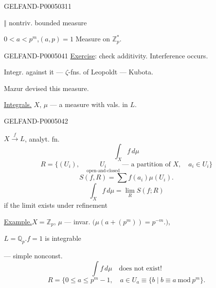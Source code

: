 \begin{GelfandAdjacentEvidence}{GELFAND-P000503}{11}

\begin{flushright}
$\Vert$ nontriv. bounded measure
\end{flushright}
$0<a<p^m$,\quad $(a,p)=1$ \quad Measure on $\mathbb Z_p^*$.
\end{GelfandAdjacentEvidence}



\begin{GelfandAdjacentEvidence}{GELFAND-P000504}{1}
\uline{Exercise}: check additivity. Interference occurs.

Integr. against it — $\zeta$-fns. of Leopoldt — Kubota.

Mazur devised this measure.

\uline{Integrals.}\qquad
$X$, $\mu$ — a measure with vals. in $L$.
\end{GelfandAdjacentEvidence}
\begin{GelfandAdjacentEvidence}{GELFAND-P000504}{2}


$X\overset f\longrightarrow L$, analyt. fn.
\[
\int_X f\,d\mu
\]
\[
R=\{(U_i),\quad\underset{\text{open-and-closed}}{U_i}
\text{ — a partition of }X,\quad a_i\in U_i\}
\]
\[
S(f,R)=\sum f(a_i)\mu(U_i).
\]
\[
\int_X f\,d\mu=\lim_R S(f;R)
\]
if the limit exists under refinement

\uline{Example.}\qquad $X=\mathbb Z_p$, $\mu$ — invar.
\(\bigl(\mu(a+(p^m))=p^{-m}.\bigr)\),

$L=\mathbb Q_p$.\qquad $f=1$ is integrable

 — simple nonconst.
\[
\int f\,d\mu\quad\text{does not exist!}
\]
\[
R=\{0\le a\le p^m-1,\quad a\in U_a\equiv\{b\mid b\equiv a\ \mathrm{mod}\ p^m\}.
\]
\end{GelfandAdjacentEvidence}
